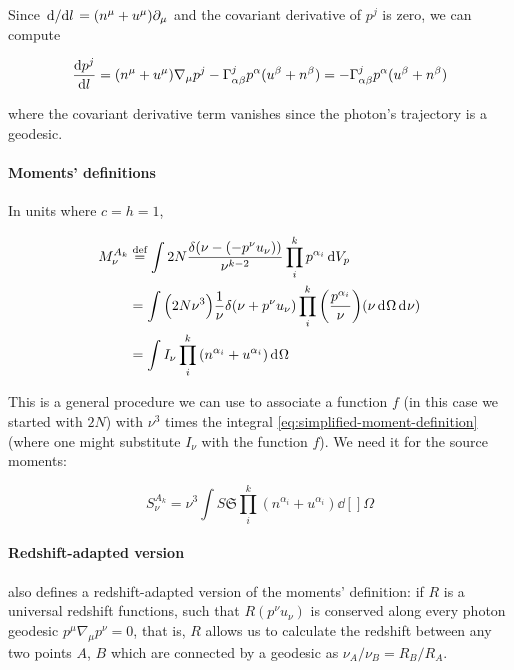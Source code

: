 \documentclass[main.tex]{subfiles}
\begin{document}
Since \(\dv*{}{l} = (n^\mu + u^\mu) \partial_\mu\) and the covariant derivative of \(p^j\) is zero, we can compute

\begin{equation}
  \dv{p^j}{l} = (n^\mu + u^\mu ) \nabla_\mu p^j - \Gamma ^j _{\alpha \beta} p^\alpha (u^\beta + n^\beta)
  = - \Gamma ^j _{\alpha \beta} p^\alpha (u^\beta + n^\beta)
\end{equation}

where the covariant derivative term vanishes since the photon's trajectory is a geodesic.

\paragraph{Moments' definitions}

In units where \(c=h=1\),

\begin{subequations}
\begin{align}
   M _\nu ^{A_k}
   &\defeq \int 2N \frac{\delta (\nu - (-p^\nu u_\nu))}{\nu^{k-2}} \prod_i^k p^{\alpha_i} \dd{V_p} \\
   &= \int \qty(2N \nu^3) \frac{1}{\nu} \delta (\nu +p^\nu u_\nu) \prod_i^k \qty(\frac{p^{\alpha_i}}{\nu}) \qty(\nu \dd[]{\Omega} \dd[]{\nu})  \\
   &= \int  I_\nu \prod_i^k \qty(n^{\alpha_i} + u^{\alpha_i}) \dd[]{\Omega} \label{eq:simplified-moment-definition}
\end{align}
\end{subequations}

This is a general procedure we can use to associate a function \(f\) (in this case we started with \(2N\)) with \(\nu^3\) times the integral \eqref{eq:simplified-moment-definition} (where one might substitute \(I _\nu\) with the function \(f\)).
We need it for the source moments:

\begin{equation}
   S_\nu ^{A_k} = \nu^3 \int S \mathfrak S \prod_i^k (n^{\alpha_i} + u^{\alpha_i}) \dd[]{\Omega}
\end{equation}

\paragraph{Redshift-adapted version}

\textcite[]{Thorne:1981feb} also defines a redshift-adapted version of the moments' definition: if \(R\) is a universal redshift functions, such that \(R (p^\nu u_\nu)\) is conserved along every photon geodesic \(p^\mu \nabla_\mu p^\nu = 0\), that is, \(R\) allows us to calculate the redshift between any two points \(A\), \(B\) which are connected by a geodesic as \(\nu_A / \nu_B = R_B / R_A\).
\end{document}
